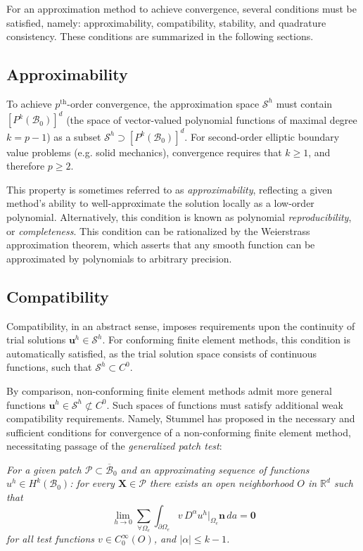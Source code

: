 For an approximation method to achieve convergence, several conditions must be satisfied, namely: approximability, compatibility, stability, and quadrature consistency. These conditions are summarized in the following sections.

	\subsection*{Approximability}
	
	To achieve $p^{\text{th}}$-order convergence, the approximation space $\mathcal{S}^h$ must contain $[ P^{k} (\mathcal{B}_0) ]^d$ (the space of vector-valued polynomial functions of maximal degree $k = p-1$) as a subset $\mathcal{S}^h \supset [ P^{k} (\mathcal{B}_0) ]^d$. For second-order elliptic boundary value problems (e.g. solid mechanics), convergence requires that $k \geq 1$, and therefore $p \geq 2$.
	
	This property is sometimes referred to as \textit{approximability}, reflecting a given method's ability to well-approximate the solution locally as a low-order polynomial. Alternatively, this condition is known as polynomial \textit{reproducibility}, or \textit{completeness}. This condition can be rationalized by the Weierstrass approximation theorem, which asserts that any smooth function can be approximated by polynomials to arbitrary precision.
	
	\subsection*{Compatibility}

	 Compatibility, in an abstract sense, imposes requirements upon the continuity of trial solutions $\mathbf{u}^h \in \mathcal{S}^h$. For conforming finite element methods, this condition is automatically satisfied, as the trial solution space consists of continuous functions, such that $\mathcal{S}^h \subset C^0$.

By comparison, non-conforming finite element methods admit more general functions $\mathbf{u}^h \in \mathcal{S}^h \not\subset C^0$. Such spaces of functions must satisfy additional weak compatibility requirements. Namely, Stummel has proposed in \cite{Stummel:79} the necessary and sufficient conditions for convergence of a non-conforming finite element method, necessitating passage of the \textit{generalized patch test}:

\textit{For a given patch $\mathcal{P} \subset \overline{\mathcal{B}}_0$ and an approximating sequence of functions $u^h \in H^k (\mathcal{B}_0)$: for every $\mathbf{X} \in \mathcal{P}$ there exists an open neighborhood $O$ in $\mathbb{R}^d$ such that}
\begin{equation}
  \lim_{h \rightarrow 0} \sum_{\forall \Omega_e} \int_{\partial \Omega_e} v \, D^\alpha u^h|_{\Omega_e} \mathbf{n} \, da = \mathbf{0}
\end{equation}
\textit{for all test functions $v \in C^{\infty}_0 (O)$, and $| \alpha | \leq k-1$.}

